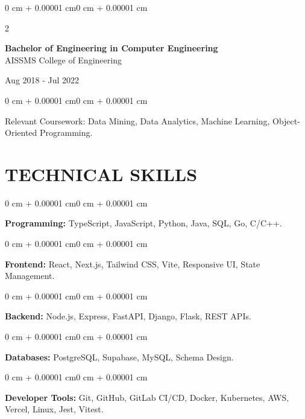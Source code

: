 \documentclass[10pt, letterpaper]{article}
\newenvironment{onecolentry}{
    \begin{adjustwidth}{0 cm + 0.00001 cm}{0 cm + 0.00001 cm}
}{
    \end{adjustwidth}
}
\newenvironment{twocolentry}[2][]{
    \onecolentry
    \def\secondColumn{#2}
    \setcolumnwidth{\fill, 4.5 cm}
    \begin{paracol}{2}
}{
    \switchcolumn \raggedleft \secondColumn
    \end{paracol}
    \endonecolentry
}
\begin{document}
\begin{twocolentry}{
    Aug 2018 - Jul 2022
}
    \textbf{Bachelor of Engineering in Computer Engineering} \\
    AISSMS College of Engineering
\end{twocolentry}
\begin{onecolentry}
Relevant Coursework: Data Mining, Data Analytics, Machine Learning, Object-Oriented Programming.
\end{onecolentry}
\section{TECHNICAL SKILLS}
\begin{onecolentry}
\textbf{Programming:} TypeScript, JavaScript, Python, Java, SQL, Go, C/C++.
\end{onecolentry}
\vspace{0.06 cm}
\begin{onecolentry}
\textbf{Frontend:} React, Next.js, Tailwind CSS, Vite, Responsive UI, State Management.
\end{onecolentry}
\vspace{0.06 cm}
\begin{onecolentry}
\textbf{Backend:} Node.js, Express, FastAPI, Django, Flask, REST APIs.
\end{onecolentry}
\vspace{0.06 cm}
\begin{onecolentry}
\textbf{Databases:} PostgreSQL, Supabase, MySQL, Schema Design.
\end{onecolentry}
\vspace{0.06 cm}
\begin{onecolentry}
\textbf{Developer Tools:} Git, GitHub, GitLab CI/CD, Docker, Kubernetes, AWS, Vercel, Linux, Jest, Vitest.
\end{onecolentry}

\end{document}
